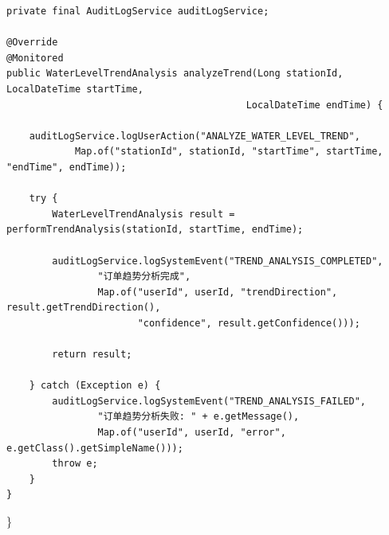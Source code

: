 \begin{verbatim}
private final AuditLogService auditLogService;

@Override
@Monitored
public WaterLevelTrendAnalysis analyzeTrend(Long stationId, LocalDateTime startTime, 
                                          LocalDateTime endTime) {
    
    auditLogService.logUserAction("ANALYZE_WATER_LEVEL_TREND", 
            Map.of("stationId", stationId, "startTime", startTime, "endTime", endTime));
    
    try {
        WaterLevelTrendAnalysis result = performTrendAnalysis(stationId, startTime, endTime);
        
        auditLogService.logSystemEvent("TREND_ANALYSIS_COMPLETED", 
                "订单趋势分析完成", 
                Map.of("userId", userId, "trendDirection", result.getTrendDirection(),
                       "confidence", result.getConfidence()));
        
        return result;
        
    } catch (Exception e) {
        auditLogService.logSystemEvent("TREND_ANALYSIS_FAILED", 
                "订单趋势分析失败: " + e.getMessage(),
                Map.of("userId", userId, "error", e.getClass().getSimpleName()));
        throw e;
    }
}
\end{verbatim}

\}

